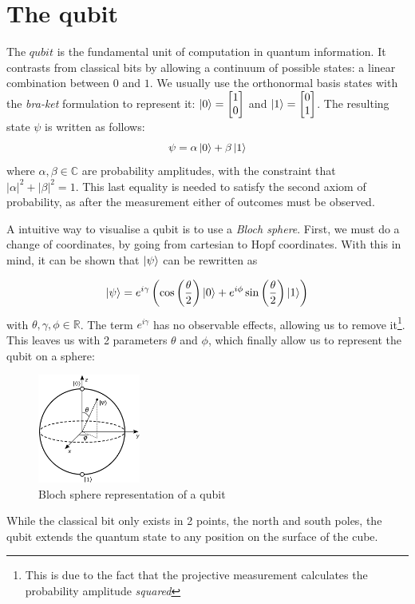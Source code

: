 \documentclass[12pt]{memoir}
\newcommand{\ti}{\textit}
\begin{document}
\section{The qubit}
The $qubit$ is the fundamental unit of computation in quantum information. It contrasts from classical bits by allowing a continuum of possible states: a linear combination between $0$ and $1$. We usually use the orthonormal basis states with the \textit{bra-ket} formulation to represent it: $\ket 0 = \begin{bmatrix}
    1\\
    0
\end{bmatrix}$ and $\ket 1 = \begin{bmatrix}
    0\\
    1
\end{bmatrix}$. The resulting state $\psi$ is written as follows:
\begin{equation}
    \psi = \alpha \ket 0 + \beta \ket 1 
\end{equation}
where $\alpha,\beta \in \mathbb{C}$ are probability amplitudes, with the constraint that $|\alpha|^2 + |\beta|^2 = 1$. This last equality is needed to satisfy the second axiom of probability, as after the measurement either of outcomes must be observed.\medbreak

A intuitive way to visualise a qubit is to use a \ti{Bloch sphere}. First, we must do a change of coordinates, by going from cartesian to Hopf coordinates. With this in mind, it can be shown that $\ket \psi$ can be rewritten as

\begin{equation}
    \ket \psi = e^{i\gamma}\left( \cos\left(\frac{\theta}{2}\right)\ket 0 + e^{i\phi} \sin\left(\frac{\theta}{2}\right)\ket 1\right)
\end{equation}
with $\theta,\gamma,\phi \in \mathbb{R}$. The term $e^{i\gamma}$ has no observable effects, allowing us to remove it\footnote{This is due to the fact that the projective measurement calculates the probability amplitude \textit{squared}}. This leaves us with 2 parameters $\theta$ and $\phi$, which finally allow us to represent the qubit on a sphere:

\begin{figure}[H]
    \centering
    \includegraphics[width=0.3\textwidth]{figures/bloch_sphere.png}
    \caption{Bloch sphere representation of a qubit \cite{wiki:qubit}}
    \label{fig:bloch-sphere}
\end{figure}
While the classical bit only exists in 2 points, the north and south poles, the qubit extends the quantum state to any position on the surface of the cube. \cite{wiki:qubit,book:Nielsen-Chuang-2010}\medbreak
\end{document}
